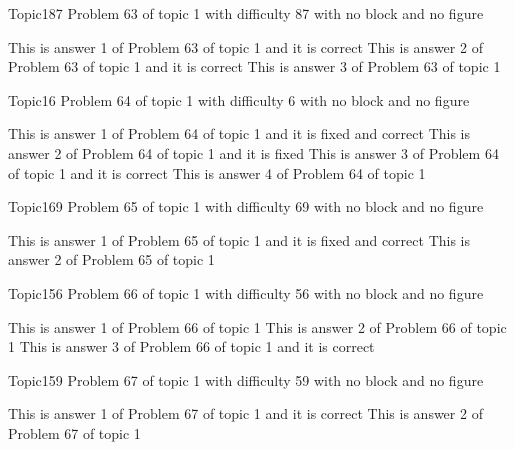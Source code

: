 \documentclass[master]{exam}
\begin{document}
\begin{problem}{Topic1}{87}
	Problem 63 of topic 1 with difficulty 87 with no block and no figure
	\begin{answers}
		\answer[correct] This is answer 1 of Problem 63 of topic 1 and it is correct
		\answer[correct] This is answer 2 of Problem 63 of topic 1 and it is correct
		\answer This is answer 3 of Problem 63 of topic 1 
	\end{answers}
\end{problem}

\begin{problem}{Topic1}{6}
	Problem 64 of topic 1 with difficulty 6 with no block and no figure
	\begin{answers}
		 This is answer 1 of Problem 64 of topic 1 and it is fixed and correct
		\answer[fixed] This is answer 2 of Problem 64 of topic 1 and it is fixed
		\answer[correct] This is answer 3 of Problem 64 of topic 1 and it is correct
		\answer This is answer 4 of Problem 64 of topic 1 
	\end{answers}
\end{problem}

\begin{problem}{Topic1}{69}
	Problem 65 of topic 1 with difficulty 69 with no block and no figure
	\begin{answers}
		 This is answer 1 of Problem 65 of topic 1 and it is fixed and correct
		\answer This is answer 2 of Problem 65 of topic 1 
	\end{answers}
\end{problem}

\begin{problem}{Topic1}{56}
	Problem 66 of topic 1 with difficulty 56 with no block and no figure
	\begin{answers}
		\answer This is answer 1 of Problem 66 of topic 1 
		\answer This is answer 2 of Problem 66 of topic 1 
		\answer[correct] This is answer 3 of Problem 66 of topic 1 and it is correct
	\end{answers}
\end{problem}

\begin{problem}{Topic1}{59}
	Problem 67 of topic 1 with difficulty 59 with no block and no figure
	\begin{answers}
		\answer[correct] This is answer 1 of Problem 67 of topic 1 and it is correct
		\answer This is answer 2 of Problem 67 of topic 1 
	\end{answers}
\end{problem}
\end{document}
